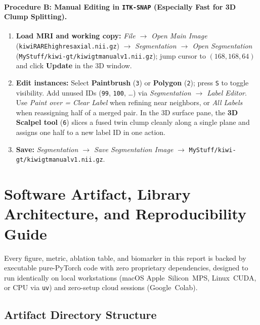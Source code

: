 \documentclass[10pt,a4paper]{article}
\renewcommand{\_}{\origunderscore\allowbreak}
\begin{document}
\paragraph{Procedure B: Manual Editing in \texttt{ITK-SNAP} (Especially Fast for 3D Clump Splitting).}
\begin{enumerate}[itemsep=1.5pt]
    \item \textbf{Load MRI and working copy:} \emph{File $\to$ Open Main Image} (\texttt{kiwi\_20050217191129\_131073\_RARE\_high\_res\_axial.nii.gz}) $\to$ \emph{Segmentation $\to$ Open Segmentation} (\texttt{MyStuff/kiwi-gt/kiwi\_gt\_manual\_v1.nii.gz}); jump cursor to $(168, 168, 64)$ and click \textbf{Update} in the 3D window.
    \item \textbf{Edit instances:} Select \textbf{Paintbrush} (\texttt{3}) or \textbf{Polygon} (\texttt{2}); press \texttt{S} to toggle visibility. Add unused IDs (\texttt{99}, \texttt{100}, \dots) via \emph{Segmentation $\to$ Label Editor}. Use \emph{Paint over = Clear Label} when refining near neighbors, or \emph{All Labels} when reassigning half of a merged pair. In the 3D surface pane, the \textbf{3D Scalpel tool} (\texttt{6}) slices a fused twin clump cleanly along a single plane and assigns one half to a new label ID in one action.
    \item \textbf{Save:} \emph{Segmentation $\to$ Save Segmentation Image} $\to$ \texttt{MyStuff/kiwi-gt/kiwi\_gt\_manual\_v1.nii.gz}.
\end{enumerate}

\clearpage
\section[Software Artifact \& Reproducibility Guide]{Software Artifact, Library Architecture, and Reproducibility Guide}
\label{app:repro}

Every figure, metric, ablation table, and biomarker in this report is backed by executable pure-PyTorch code with zero proprietary dependencies, designed to run identically on local workstations (macOS Apple~Silicon~MPS, Linux~CUDA, or CPU via \texttt{uv}) and zero-setup cloud sessions (Google~Colab).

\subsection{Artifact Directory Structure}
\end{document}
